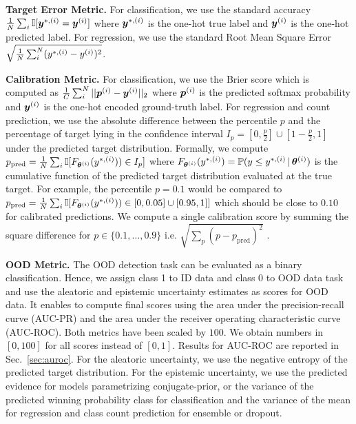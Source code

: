 \textbf{Target Error Metric.} For classification, we use the standard accuracy $\frac{1}{N}\sum_{i} \mathbb{I}[\bm{y}^{*,(i)} = \bm{y}^{(i)}]$ where $\bm{y}^{*,(i)}$ is the one-hot true label and $\bm{y}^{(i)}$ is the one-hot predicted label. For regression, we use the standard Root Mean Square Error $\sqrt{\frac{1}{N}\sum_{i}^{N} (y^{*,(i)} - y^{(i)})^2}$.

\textbf{Calibration Metric.} For classification, we use the Brier score which is computed as $\frac{1}{C}\sum^{N}_i ||\bm{p}^{(i)} - \bm{y}^{(i)}||_2$ where $\bm{p}^{(i)}$ is the predicted softmax probability and $\bm{y}^{(i)}$ is the one-hot encoded ground-truth label. For regression and count prediction, we use the absolute difference between the percentile $p$ and the percentage of target lying in the confidence interval $I_p=[0,\frac{p}{2}]\cup[1-\frac{p}{2},1]$ under the predicted target distribution. Formally, we compute $p_\text{pred} = \frac{1}{N}\sum_i \mathbb{I}[F_{\bm{\theta}^{(i)}}( y^{*, (i)})) \in I_p]$ where $F_{\bm{\theta}^{(i)}}(y^{*, (i)})=\mathbb{P}(y \leq y^{*, (i)} \,|\, \bm{\theta}^{(i)})$ is the cumulative function of the predicted target distribution evaluated at the true target. For example, the percentile $p=0.1$ would be compared to $p_\text{pred} = \frac{1}{N}\sum_i \mathbb{I}[F_{\bm{\theta}^{(i)}}( y^{*, (i)})) \in [0, 0.05] \cup [0.95, 1]]$ which should be close to $0.10$ for calibrated predictions. We compute a single calibration score by summing the square difference for $p \in \{0.1, \ldots, 0.9\}$ i.e.  $\sqrt{\sum_p (p - p_\text{pred})^2}$ \citep{accurate-uncertainties-deep-learning-regression}. 

\textbf{OOD Metric.} The OOD detection task can be evaluated as a binary classification. Hence, we assign class 1 to ID data and class 0 to OOD data task and use the aleatoric and epistemic uncertainty estimates as scores for OOD data. It enables to compute final scores using the area under the precision-recall curve (AUC-PR) and the area under the receiver operating characteristic curve (AUC-ROC). Both metrics have been scaled by $100$. We obtain numbers in $[0, 100]$  for all scores instead of $[0, 1]$. Results for AUC-ROC are reported in Sec.~\ref{sec:auroc}. For the aleatoric uncertainty, we use the negative entropy of the predicted target distribution. For the epistemic uncertainty, we use the predicted evidence for models parametrizing conjugate-prior, or the variance of the predicted winning probability class for classification and the variance of the mean for regression and class count prediction for ensemble or dropout.

